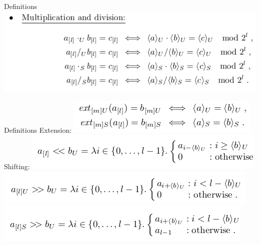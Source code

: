 \documentclass{beamer}
\begin{document}
\begin{frame}{Definitions}
\includegraphics[scale=0.5]{Multiplication.png}\newline
\end{frame}

\begin{frame}{Definitions}
Extension:\newline
\includegraphics[scale=0.5]{ext.png}\newline
Shifting:\newline
\includegraphics[scale=0.5]{sh0.png}\newline
\includegraphics[scale=0.5]{sh1.png}\newline
\includegraphics[scale=0.5]{sh2.png}\newline
\end{frame}
\end{document}

